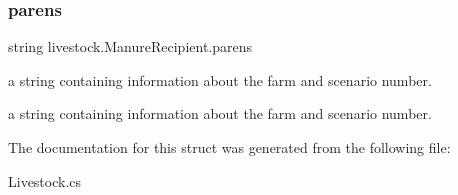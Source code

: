 \subsubsection{\texorpdfstring{parens}{parens}}
{\footnotesize\ttfamily string livestock.\+Manure\+Recipient.\+parens}



a string containing information about the farm and scenario number. 

a string containing information about the farm and scenario number. 

The documentation for this struct was generated from the following file\+:\begin{DoxyCompactItemize}
\item 
Livestock.\+cs\end{DoxyCompactItemize}
